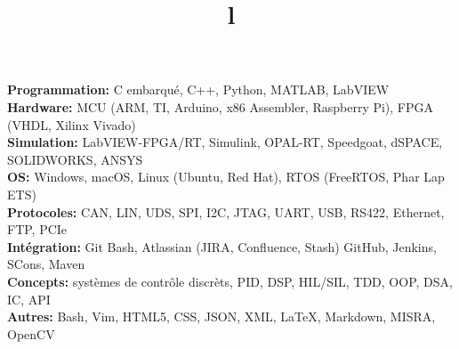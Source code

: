 \documentclass[mm]{res}
\begin{document}



\begin{resume}

\npspctoprule
\section{\headingskills}
\tb \textbf{Programmation:} C embarqu\'e, C++, Python, MATLAB, LabVIEW\\
\tb \textbf{Hardware:} MCU (ARM, TI, Arduino, x86 Assembler, Raspberry Pi), FPGA (VHDL, Xilinx Vivado)\\
\tb \textbf{Simulation:} LabVIEW-FPGA/RT, Simulink, OPAL-RT, Speedgoat, dSPACE, SOLIDWORKS, ANSYS\\
\tb \textbf{OS:} Windows, macOS, Linux (Ubuntu, Red Hat), RTOS (FreeRTOS, Phar Lap ETS)\\
\tb \textbf{Protocoles:} CAN, LIN, UDS, SPI, I2C, JTAG, UART, USB, RS422, Ethernet, FTP, PCIe\\
\tb \textbf{Int\'egration:} Git Bash, Atlassian (JIRA, Confluence, Stash) GitHub, Jenkins, SCons, Maven\\
\tb \textbf{Concepts:} syst\`emes de contr\^ole discr\`ets, PID, DSP, HIL/SIL, TDD, OOP, DSA, IC, API\\
\tb \textbf{Autres:} Bash, Vim, HTML5, CSS, JSON, XML, \LaTeX, Markdown, MISRA, OpenCV


\toprule

\section{\headingeducation}
\begin{format}
\\
\title{l}\\
\end{format}  


\end{resume}
\end{document}
